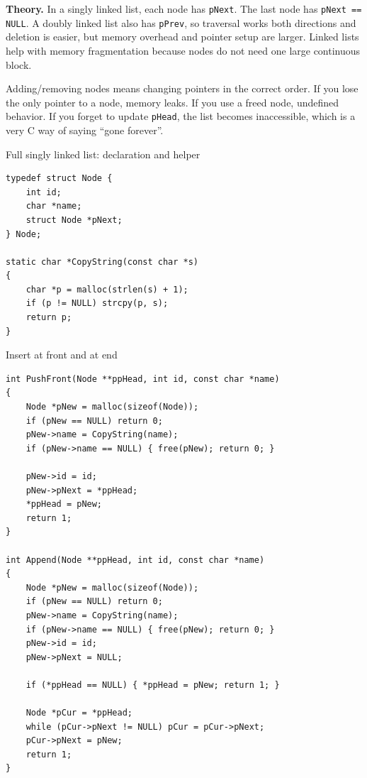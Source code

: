 \documentclass[9pt,a4paper]{article}
\newcommand{\code}[1]{\texttt{#1}}
\begin{document}
\textbf{Theory.} In a singly linked list, each node has \code{pNext}. The last node has \code{pNext == NULL}. A doubly linked list also has \code{pPrev}, so traversal works both directions and deletion is easier, but memory overhead and pointer setup are larger. Linked lists help with memory fragmentation because nodes do not need one large continuous block.

\begin{danger}
Adding/removing nodes means changing pointers in the correct order. If you lose the only pointer to a node, memory leaks. If you use a freed node, undefined behavior. If you forget to update \code{pHead}, the list becomes inaccessible, which is a very C way of saying ``gone forever''.
\end{danger}

\begin{codebox}{Full singly linked list: declaration and helper}
\begin{lstlisting}[style=cstyle]
typedef struct Node {
    int id;
    char *name;
    struct Node *pNext;
} Node;

static char *CopyString(const char *s)
{
    char *p = malloc(strlen(s) + 1);
    if (p != NULL) strcpy(p, s);
    return p;
}
\end{lstlisting}
\end{codebox}

\begin{codebox}{Insert at front and at end}
\begin{lstlisting}[style=cstyle]
int PushFront(Node **ppHead, int id, const char *name)
{
    Node *pNew = malloc(sizeof(Node));
    if (pNew == NULL) return 0;
    pNew->name = CopyString(name);
    if (pNew->name == NULL) { free(pNew); return 0; }

    pNew->id = id;
    pNew->pNext = *ppHead;
    *ppHead = pNew;
    return 1;
}

int Append(Node **ppHead, int id, const char *name)
{
    Node *pNew = malloc(sizeof(Node));
    if (pNew == NULL) return 0;
    pNew->name = CopyString(name);
    if (pNew->name == NULL) { free(pNew); return 0; }
    pNew->id = id;
    pNew->pNext = NULL;

    if (*ppHead == NULL) { *ppHead = pNew; return 1; }

    Node *pCur = *ppHead;
    while (pCur->pNext != NULL) pCur = pCur->pNext;
    pCur->pNext = pNew;
    return 1;
}
\end{lstlisting}
\end{codebox}
\end{document}
